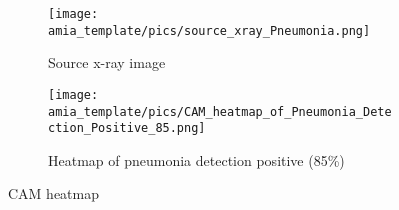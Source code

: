 \documentclass{amia}
\begin{document}
\makeatletter

\bigskip

\begin{figure}
\centering
\begin{subfigure}{.4\textwidth}
  \centering
  \texttt{[image: amia\_template/pics/source\_xray\_Pneumonia.png]}
  \caption{Source x-ray image}
  \label{fig:sub1}
\end{subfigure}
\begin{subfigure}{.4\textwidth}
  \centering
  \texttt{[image: amia\_template/pics/CAM\_heatmap\_of\_Pneumonia\_Detection\_Positive\_85.png]}
  \caption{Heatmap of pneumonia detection positive (85\%)}
  \label{fig:sub2}
\end{subfigure}
\caption{CAM heatmap \cite{ref5} }
\label{fig:cam_heatmap}
\end{figure}

\renewcommand{\@biblabel}[1]{\hfill #1.}
\makeatother
\end{document}
